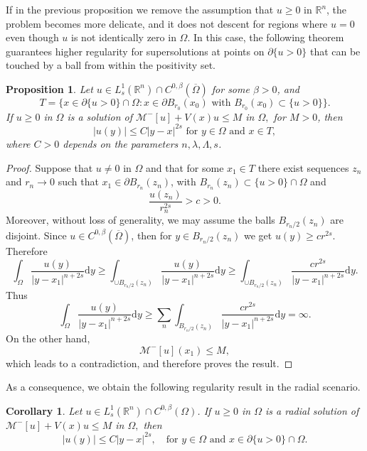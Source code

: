 \documentclass[11pt]{article}
\newtheorem{proposition}{Proposition}
\newtheorem{corollary}{Corollary}
\begin{document}
If in the previous proposition we remove the assumption that \( u \geq 0 \) in \( \mathbb{R}^{n} \), the problem becomes more delicate, and it does not descent for regions where \( u = 0 \) even though \( u \) is not identically zero in \( \Omega \). In this case, the following theorem guarantees higher regularity for supersolutions at points on \( \partial\{u > 0\} \) that can be touched by a ball from within the positivity set.


\begin{proposition} Let \(u\in L^{1}_{s}(\mathbb{R}^{n})\cap C^{0,\beta}(\overline{\Omega})\) for some \(\beta>0\), and \[T=\{x\in \partial\{u>0\}\cap\Omega:x\in \partial B_{r_0}(x_0) \mbox{ with }B_{r_0}(x_0) \subset \{u>0\}\}.\]
If \(u\geq 0\) in \(\Omega\) is a solution of $\mathcal{M}^{-}[u] + V(x)u \leq M$ in $ \Omega,$ for \(M>0\), then \[|u(y)|\leq C|y-x|^{2s} \mbox{ for } y\in \Omega \mbox{ and } x\in T,\] where \(C>0\) depends on the parameters \(n,\lambda,\Lambda,s\).
\end{proposition}

\begin{proof} Suppose that $u\neq0$ in $\Omega$ and that for some $x_1\in T$ there exist sequences $z_n$ and $r_n\rightarrow0$ such that $x_1\in \partial B_{r_n}(z_n)$, with $B_{r_n}(z_n)\subset\{u>0\}\cap \Omega $ and \[\frac{u(z_n)}{r_n^{2s}}>c>0.\] Moreover, without loss of generality, we may assume the balls $B_{r_n/2}(z_n)$ are disjoint. Since $u\in C^{0,\beta}(\overline{\Omega})$, then for \(y\in B_{r_n/2}(z_n)\) we get $u(y)\geq cr^{2s}.$ Therefore
\begin{equation*}
    \displaystyle\int_{\Omega}\frac{u(y)}{|y-x_1|^{n+2s}}\mathrm{d}y\geq \int_{\cup B_{r_n/2}(z_n) }\frac{u(y)}{|y-x_1|^{n+2s}}\mathrm{d}y\geq \int_{\cup B_{r_n/2}(z_n) }\frac{cr^{2s}}{|y-x_1|^{n+2s}}\mathrm{d}y.
\end{equation*}
Thus
\begin{equation*}
    \int_{\Omega}\frac{u(y)}{|y-x_1|^{n+2s}}\mathrm{d}y\geq \sum_{n} \int_{ B_{r_n/2}(z_n) }\frac{cr^{2s}}{|y-x_1|^{n+2s}}\mathrm{d}y=\infty.
\end{equation*}
On the other hand,
$$
\mathcal{M}^{-}[u](x_1)\leq M,
$$
which leads to a contradiction, and therefore proves the result.
\end{proof}
As a consequence, we obtain the following regularity result in the radial scenario.

\begin{corollary}
Let \( u \in L^{1}_{s}(\mathbb{R}^{n})\cap C^{0,\beta}(\Omega) \). If \( u \geq 0 \) in \( \Omega \) is a radial solution of
$
\mathcal{M}^{-}[u] + V(x) u \leq M$ in $ \Omega,$
then
\[
|u(y)| \leq C |y - x|^{2s}, \quad \text{for } y \in \Omega \text{ and } x \in \partial\{u > 0\} \cap \Omega.
\]
\end{corollary}
\end{document}
